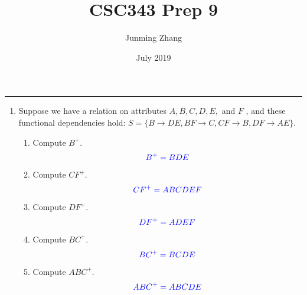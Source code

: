 \documentclass{article}
\title{CSC343 Prep 9}
\author{Junming Zhang}
\date{July 2019}
\begin{document}
\maketitle
\noindent
{\color{red} \rule{\linewidth}{0.25mm} }

\begin{enumerate}
    \item Suppose we have a relation on attributes $A, B, C, D, E,$ and $F$ , and these functional dependencies hold: $S=\{B \rightarrow DE, BF \rightarrow C, CF \rightarrow B, DF \rightarrow AE\}$.
    \begin{enumerate}
        \item Compute $B^+$.
        \[\textcolor{blue}{B^+ = BDE}\]
        \item Compute $CF^+$.
        \[\textcolor{blue}{CF^+ = ABCDEF}\]
        \item Compute $DF^+$.
        \[\textcolor{blue}{DF^+ = ADEF}\]
        \item Compute $BC^+$.
        \[\textcolor{blue}{BC^+ = BCDE}\]
        \item Compute $ABC^+$.
        \[\textcolor{blue}{ABC^+ = ABCDE}\]
    \end{enumerate}
    

\end{enumerate}
\end{document}

